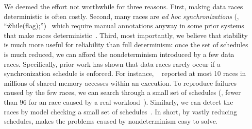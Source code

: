 We deemed the effort not worthwhile for three reasons. First, making data
races deterministic is often costly.  Second, many races are \emph{ad hoc
  synchronizations} (\eg, ``\v{while(flag)};'')~\cite{syncfinder:osdi10}
which require manual annotations anyway in some prior systems that make
races deterministic~\cite{dthreads:sosp11, grace:oopsla09}.  Third, most
importantly, we believe that stability is much more useful for reliability
than full determinism: once the set of schedules is much reduced, we can
afford the nondeterminism introduced by a few data races.  Specifically,
prior work has shown that data races rarely occur if a synchronization
schedule is enforced.  For instance, \peregrine~\cite{peregrine:sosp11}
reported at most 10 races in millions of shared memory accesses
within an execution.  To reproduce failures caused by the few races, we
can search through a small set of schedules (\eg, fewer than 96 for
an \apache race caused by a real workload~\cite{pres:sosp09}).  Similarly,
we can detect the races by model checking a small set of
schedules~\cite{musuvathi:chess:osdi08}. In short, by vastly reducing
schedules, \smt makes the problems caused by nondeterminism easy to solve.



